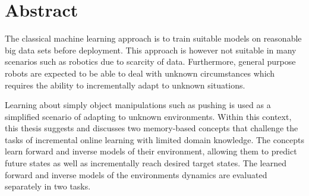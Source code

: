 



\chapter*{\enskip Abstract}

The classical machine learning approach is to train suitable models on reasonable big data sets before deployment. This approach is however not suitable in many scenarios such as robotics due to scarcity of data. Furthermore, general purpose robots are expected to be able to deal with unknown circumstances which requires the ability to incrementally adapt to unknown situations.

Learning about simply object manipulations such as pushing is used as a simplified scenario of adapting to unknown environments.
Within this context, this thesis suggests and discusses two memory-based concepts that challenge the tasks of incremental online learning with limited domain knowledge.
The concepts learn forward and inverse models of their environment, allowing them to predict future states as well as incrementally reach desired target states.
The learned forward and inverse models of the environments dynamics are evaluated separately in two tasks.


